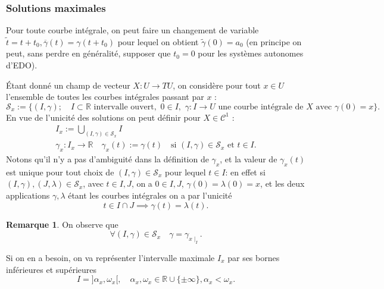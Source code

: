 \documentclass[french]{article}
\theoremstyle{definition}
\newtheorem{protoremark}{Remarque}[section]
\newenvironment{remark}
    {\colorlet{shadecolor}{yellow!5}\begin{shaded}\begin{protoremark}}
    {\end{protoremark}\end{shaded}}
\newcommand{\R}{\mathbb{R}}
\begin{document}
\subsubsection{Solutions maximales}

Pour toute courbe intégrale, on peut faire un changement de variable \(\tilde{t} = t+ t_0, \overline{\gamma}(t) = \gamma(t + t_0)\) pour lequel on obtient \(\tilde{\gamma}(0) = a_0\) (en principe on peut, sans perdre en généralité, supposer que \(t_0 = 0\) pour les systèmes autonomes d'EDO).

\'Etant donn\'e un champ de vecteur $X: U \to TU$, on consid\`ere  pour tout $x\in U$ l'ensemble de toutes les courbes int\'egrales passant par $x$ :
\[
 \mathcal{S}_x := \{(I, \gamma);\quad I\subset \R \,\, \text{intervalle ouvert},\,\, 0\in I,\,\, \gamma:I \to U \,\, \text{une courbe int\'egrale de}\,\, X \,\, \text{avec}\,\, \gamma(0)=x \}.
\]  En vue de l'unicit\'e des solutions on peut d\'efinir pour $X\in \mathcal{C}^1$ :
\begin{gather*}
I_x:= \bigcup_{(I, \gamma) \in  \mathcal{S}_x} I \\  \gamma_x : I_x \to \R \quad \gamma_x(t) := \gamma(t) \quad \text{si}\,\,  (I, \gamma) \in  \mathcal{S}_x\,\, \text{et} \,\, t\in I.
\end{gather*} Notons qu'il n'y a pas d'ambiguit\'e dans la d\'efinition de $\gamma_x$, et  la valeur de $\gamma_x(t)$ est unique pour tout choix de $(I, \gamma) \in  \mathcal{S}_x$ pour lequel $t\in I$: en effet si $(I,\gamma), (J, \lambda) \in  \mathcal{S}_x$, avec $t\in I, J$, on a
$0\in I, J$, $\gamma(0) = \lambda(0) = x$, et les deux applications $\gamma, \lambda$ \'etant les courbes int\'egrales on a par l'unicit\'e
\[
t\in I\cap J \implies \gamma(t) = \lambda(t).
\]

\begin{remark}
On observe que
\[
\forall (I, \gamma) \in  \mathcal{S}_x \quad \gamma = \gamma_{x\mid_I}.
\]
\end{remark}

Si on en a besoin, on va repr\'esenter l'intervalle maximale $I_x$ par ses bornes inf\'erieures et sup\'erieures \[I= ]\alpha_x, \omega_x[, \quad \alpha_x, \omega_x \in \R \cup \{\pm \infty\}, \alpha_x <
\omega_x.\]
\end{document}
